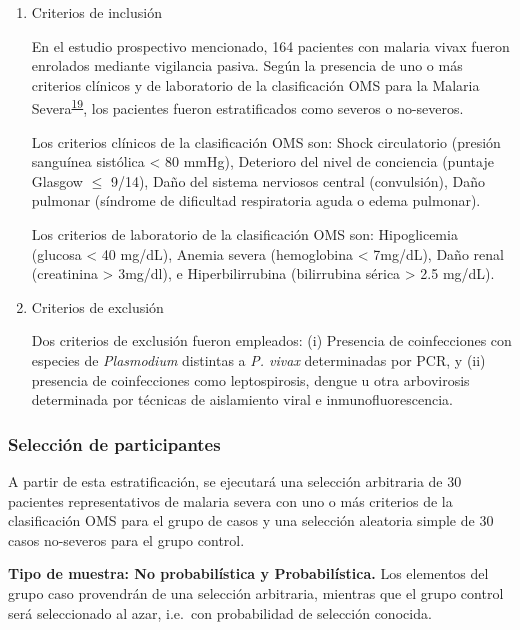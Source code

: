 \documentclass[]{article}
\begin{document}
\begin{enumerate}
\def\labelenumi{\alph{enumi}.}
\item
  Criterios de inclusión

  En el estudio prospectivo mencionado, 164 pacientes con malaria vivax
  fueron enrolados mediante vigilancia pasiva. Según la presencia de uno
  o más criterios clínicos y de laboratorio de la clasificación OMS para
  la Malaria
  Severa\textsuperscript{\protect\hyperlink{ref-WHO2014severe}{19}}, los
  pacientes fueron estratificados como severos o no-severos.

  Los criterios clínicos de la clasificación OMS son: Shock circulatorio
  (presión sanguínea sistólica \textless{} 80 mmHg), Deterioro del nivel
  de conciencia (puntaje Glasgow \(\le\) 9/14), Daño del sistema
  nerviosos central (convulsión), Daño pulmonar (síndrome de dificultad
  respiratoria aguda o edema pulmonar).

  Los criterios de laboratorio de la clasificación OMS son: Hipoglicemia
  (glucosa \textless{} 40 mg/dL), Anemia severa (hemoglobina \textless{}
  7mg/dL), Daño renal (creatinina \textgreater{} 3mg/dl), e
  Hiperbilirrubina (bilirrubina sérica \textgreater{} 2.5 mg/dL). 
\item
  Criterios de exclusión

  Dos criterios de exclusión fueron empleados: (i) Presencia de
  coinfecciones con especies de \emph{Plasmodium} distintas a \emph{P.
  vivax} determinadas por PCR, y (ii) presencia de coinfecciones como
  leptospirosis, dengue u otra arbovirosis determinada por técnicas de
  aislamiento viral e inmunofluorescencia. 
\end{enumerate}

\subsubsection{Selección de
participantes}\label{seleccion-de-participantes}

A partir de esta estratificación, se ejecutará una selección arbitraria
de 30 pacientes representativos de malaria severa con uno o más
criterios de la clasificación OMS para el grupo de casos y una selección
aleatoria simple de 30 casos no-severos para el grupo control.

\textbf{Tipo de muestra: No probabilística y Probabilística.} Los
elementos del grupo caso provendrán de una selección arbitraria,
mientras que el grupo control será seleccionado al azar, i.e.~con
probabilidad de selección conocida.
\end{document}
